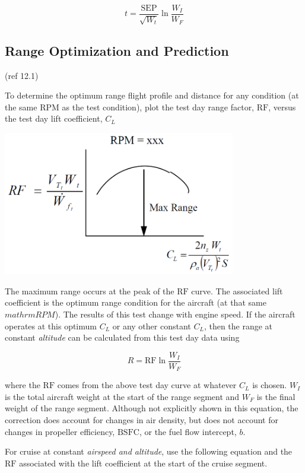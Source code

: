 \documentclass[
]{book}
\begin{document}
\[
t = \frac{\mathrm{SEP}}{\sqrt{W_t}} \ln \frac{W_I}{W_F}
\label{eq:tot-endur-time-const-sep-cl}
\]

\hypertarget{range-optimization-and-prediction}{%
\subsection{Range Optimization and Prediction}\label{range-optimization-and-prediction}}

(ref 12.1)

To determine the optimum range flight profile and distance for any condition (at
the same \(\mathrm{RPM}\) as the test condition), plot the test day range
factor, \(\mathrm{RF}\), versus the test day lift coefficient, \(C_L\)

\includegraphics[width=4in,height=\textheight]{media/12/rng-factor-cl-curve.png}

The maximum range occurs at the peak of the \(\mathrm{RF}\) curve. The
associated lift coefficient is the optimum range condition for the aircraft
(at that same \(mathrm{RPM}\)). The results of this test change with engine
speed. If the aircraft operates at this optimum \(C_L\) or any other constant
\(C_L\), then the range at constant \emph{altitude} can be calculated from this test
day data using

\[
R = \mathrm{RF} \ln \frac{W_I}{W_F}
\label{eq:const-alt-rng}
\]

where the \(\mathrm{RF}\) comes from the above test day curve at whatever
\(C_L\) is chosen. \(W_I\) is the total aircraft weight at the start of the
range segment and \(W_F\) is the final weight of the range segment. Although not
explicitly shown in this equation, the correction does account for changes in
air density, but does not account for changes in propeller efficiency,
\(\mathrm{BSFC}\), or the fuel flow intercept, \(b\).

For cruise at constant \emph{airspeed and altitude}, use the following equation and
the \(\mathrm{RF}\) associated with the lift coefficient at the start of the
cruise segment.
\end{document}
